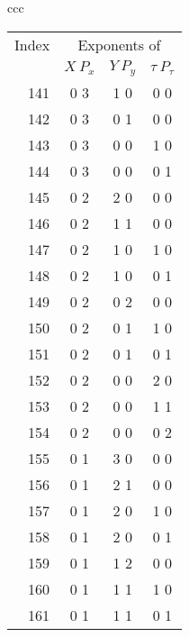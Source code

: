 {\begin{center}
\newpage
\begin{tabular}{ccc}
\begin{tabular}{rccc}
\multicolumn{1}{c}{Index} &
\multicolumn{3}{c}{Exponents of}\\
&$X\:P_x$&$Y\:P_y$&$\tau\:P_\tau$\\
141\hspace*{.125in}&0 3&1 0&0 0\\
142\hspace*{.125in}&0 3&0 1&0 0\\
143\hspace*{.125in}&0 3&0 0&1 0\\
144\hspace*{.125in}&0 3&0 0&0 1\\
145\hspace*{.125in}&0 2&2 0&0 0\\
146\hspace*{.125in}&0 2&1 1&0 0\\
147\hspace*{.125in}&0 2&1 0&1 0\\
148\hspace*{.125in}&0 2&1 0&0 1\\
149\hspace*{.125in}&0 2&0 2&0 0\\
150\hspace*{.125in}&0 2&0 1&1 0\\
151\hspace*{.125in}&0 2&0 1&0 1\\
152\hspace*{.125in}&0 2&0 0&2 0\\
153\hspace*{.125in}&0 2&0 0&1 1\\
154\hspace*{.125in}&0 2&0 0&0 2\\
155\hspace*{.125in}&0 1&3 0&0 0\\
156\hspace*{.125in}&0 1&2 1&0 0\\
157\hspace*{.125in}&0 1&2 0&1 0\\
158\hspace*{.125in}&0 1&2 0&0 1\\
159\hspace*{.125in}&0 1&1 2&0 0\\
160\hspace*{.125in}&0 1&1 1&1 0\\
161\hspace*{.125in}&0 1&1 1&0 1\\

\end{tabular}
\end{tabular}
\end{center}}

